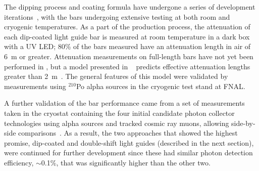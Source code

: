 The dipping process and coating formula have undergone a series of development iterations~\cite{Moss:2014ota},
with the bars undergoing extensive testing at both room and cryogenic temperatures.
As a part of the production process, the attenuation of each dip-coated light guide bar is measured at room temperature in a dark box with a UV LED; 80\% of the bars measured have an attenuation length in air of \SI{6}{m} or greater.   
Attenuation measurements on full-length bars have not yet been performed in \lar, but a model presented in ~\cite{Moss:2014ota} predicts effective attenuation lengths greater than \SI{2}{m}~\cite{Moss:2016yhb}.  The general features of this model were validated by measurements using $^{210}$Po alpha sources in the  cryogenic test stand at FNAL.

A further validation of the bar performance came from a set of measurements taken in the  cryostat containing the four initial candidate photon collector technologies using alpha sources and tracked cosmic ray muons, allowing side-by-side comparisons~\cite{Whittington:2015rkr}.  As a result, the two approaches that showed the highest promise, dip-coated and double-shift light guides (described in the next section), were continued for further development since these had similar photon detection efficiency, $\sim$0.1\%, that was significantly higher than the other two. 




